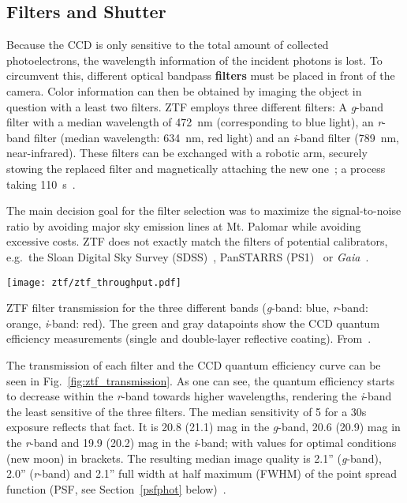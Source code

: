 \subsection{Filters and Shutter}\label{ztf_filters}
Because the CCD is only sensitive to the total amount of collected photoelectrons, the wavelength information of the incident photons is lost. To circumvent this, different optical bandpass \textbf{filters} must be placed in front of the camera. Color information can then be obtained by imaging the object in question with a least two filters. ZTF employs three different filters: A \textit{g}-band filter with a median wavelength of \SI{472}{\nano\meter} (corresponding to blue light), an \textit{r}-band filter (median wavelength: \SI{634}{\nano\meter}, red light) and an \textit{i}-band filter (\SI{789}{\nano\meter}, near-infrared). These filters can be exchanged with a robotic arm, securely stowing the replaced filter and magnetically attaching the new one~\cite{Dekany2020}; a process taking \SI{110}{\second}~\cite{Bellm2019}.

The main decision goal for the filter selection was to maximize the signal-to-noise ratio by avoiding major sky emission lines at Mt. Palomar while avoiding excessive costs. ZTF does not exactly match the filters of potential calibrators, e.g.\ the Sloan Digital Sky Survey (SDSS)~, PanSTARRS (PS1)~ or \textit{Gaia}~.

\begin{marginfigure}
    \texttt{[image: ztf/ztf\_throughput.pdf]}
    \caption[ZTF filter transmission]{ZTF filter transmission for the three different bands (\textit{g}-band: blue, \textit{r}-band: orange, \textit{i}-band: red). The green and gray datapoints show the CCD quantum efficiency measurements (single and double-layer reflective coating). From~\cite{Bellm2019}.}
\end{marginfigure}

The transmission of each filter and the CCD quantum efficiency curve can be seen in Fig.~\ref{fig:ztf_transmission}. As one can see, the quantum efficiency starts to decrease within the \textit{r}-band towards higher wavelengths, rendering the \textit{i}-band the least sensitive of the three filters. The median sensitivity of \SI{5}{\sigma} for a 30s exposure reflects that fact. It is 20.8 (21.1) mag in the \textit{g}-band, 20.6 (20.9) mag in the \textit{r}-band and 19.9 (20.2) mag in the \textit{i}-band; with values for optimal conditions (new moon) in brackets. The resulting median image quality is 2.1'' (\textit{g}-band), 2.0'' (\textit{r}-band) and 2.1'' full width at half maximum (FWHM) of the point spread function (PSF, see Section~\ref{psfphot} below)~\cite{Bellm2019}.

